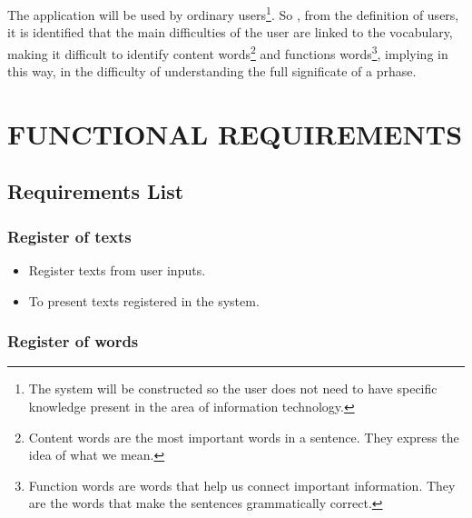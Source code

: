 \documentclass[11pt, twoside, a4paper]{book}
\begin{document}
			The application will be used by ordinary users\footnote{The system will be constructed so the user does not need to have specific knowledge present in the area of information technology.}. So , from the definition of users, it is identified that the main difficulties of the user are linked to the vocabulary, making it difficult to identify content words\footnote{Content words are the most important words in a sentence. They express the idea of what we mean.} and functions words\footnote{Function words are words that help us connect important information. They are the words that make the sentences grammatically correct.}, implying in this way, in the difficulty of understanding the full significate of a prhase.
			
	\chapter{FUNCTIONAL REQUIREMENTS}
	
		\section{Requirements List}
		
			\subsection{Register of texts}
			
				\begin{itemize}
					\item Register texts from user inputs.
				
					\item To present texts registered in the system.
				\end{itemize}

			\subsection{Register of words}
\end{document}
